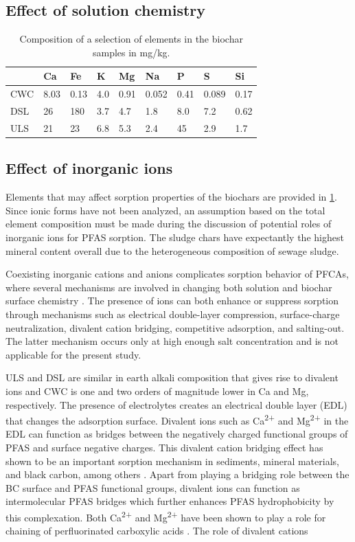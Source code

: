 \subsection{Effect of solution chemistry}

\begin{table}
\centering
\caption{Composition of a selection of elements in the biochar samples in mg/kg.}
\label{tab:BC_mainElements}
\begin{tabular}{lllllllll} \toprule
 & Ca & Fe & K & Mg & Na & P & S & Si \\ \midrule
CWC & 8.03 & 0.13 & 4.0 & 0.91 & 0.052 & 0.41 & 0.089 & 0.17 \\
DSL & 26 & 180 & 3.7 & 4.7 & 1.8 & 8.0 & 7.2 & 0.62 \\
ULS & 21 & 23 & 6.8 & 5.3 & 2.4 & 45 & 2.9 & 1.7 \\ \bottomrule
\end{tabular}
\end{table}

\subsection{Effect of inorganic ions}
Elements that may affect sorption properties of the biochars are provided in \cref{tab:BC_mainElements}. Since ionic forms have not been analyzed, an assumption based on the total element composition must be made during the discussion of potential roles of inorganic ions for PFAS sorption. The sludge chars have expectantly the highest mineral content overall due to the heterogeneous composition of sewage sludge. 

Coexisting inorganic cations and anions complicates sorption behavior of PFCAs, where several mechanisms are involved in changing both solution and biochar surface chemistry \citep{du2014adsorption}. The presence of ions can both enhance or suppress sorption through mechanisms such as electrical double-layer compression, surface-charge neutralization, divalent cation bridging, competitive adsorption, and salting-out. The latter mechanism occurs only at high enough salt concentration and is not applicable for the present study. 

ULS and DSL are similar in earth alkali composition that gives rise to divalent ions  and CWC is one and two orders of magnitude lower in Ca and Mg, respectively. The presence of electrolytes creates an electrical double layer (EDL) that changes the adsorption surface. Divalent ions such as Ca\textsuperscript{2+} and Mg\textsuperscript{2+} in the EDL can function as bridges between the negatively charged functional groups of PFAS and surface negative charges. This divalent cation bridging effect has shown to be an important sorption mechanism in sediments, mineral materials, and black carbon, among others \citep{higgins2006sorption}. Apart from playing a bridging role between the BC surface and PFAS functional groups, divalent ions can function as intermolecular PFAS bridges which further enhances PFAS hydrophobicity by this complexation. Both Ca\textsuperscript{2+} and Mg\textsuperscript{2+} have been shown to play a role for chaining of perfluorinated carboxylic acids \citep{wang2011}. The role of divalent cations  

